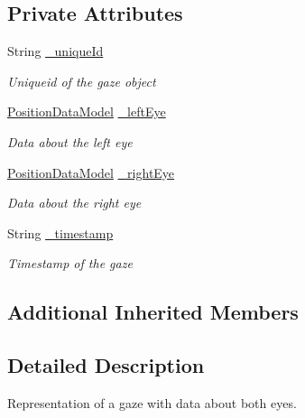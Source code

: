 \subsection*{Private Attributes}
\begin{DoxyCompactItemize}
\item 
String \hyperlink{class_web_analyzer_1_1_models_1_1_data_model_1_1_gaze_model_a6b834df87de0ac145676b7385f2bdcb4}{\+\_\+unique\+Id}
\begin{DoxyCompactList}\small\item\em Uniqueid of the gaze object \end{DoxyCompactList}\item 
\hyperlink{class_web_analyzer_1_1_models_1_1_data_model_1_1_position_data_model}{Position\+Data\+Model} \hyperlink{class_web_analyzer_1_1_models_1_1_data_model_1_1_gaze_model_a95213ed60e16c99277c83349acbba88d}{\+\_\+left\+Eye}
\begin{DoxyCompactList}\small\item\em Data about the left eye \end{DoxyCompactList}\item 
\hyperlink{class_web_analyzer_1_1_models_1_1_data_model_1_1_position_data_model}{Position\+Data\+Model} \hyperlink{class_web_analyzer_1_1_models_1_1_data_model_1_1_gaze_model_ac5b10c7779e4a0e426aba35246991cf9}{\+\_\+right\+Eye}
\begin{DoxyCompactList}\small\item\em Data about the right eye \end{DoxyCompactList}\item 
String \hyperlink{class_web_analyzer_1_1_models_1_1_data_model_1_1_gaze_model_a313637ceeff4c9c9bc46c03d9c2b7278}{\+\_\+timestamp}
\begin{DoxyCompactList}\small\item\em Timestamp of the gaze \end{DoxyCompactList}\end{DoxyCompactItemize}
\subsection*{Additional Inherited Members}


\subsection{Detailed Description}
Representation of a gaze with data about both eyes. 



